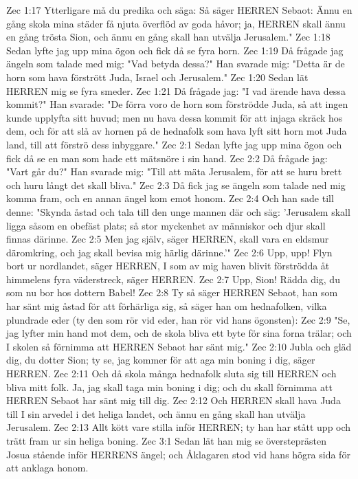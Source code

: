 Zec 1:17  Ytterligare må du predika och säga: Så säger HERREN Sebaot: Ännu en gång skola mina städer få njuta överflöd av goda håvor; ja, HERREN skall ännu en gång trösta Sion, och ännu en gång skall han utvälja Jerusalem."
Zec 1:18  Sedan lyfte jag upp mina ögon och fick då se fyra horn.
Zec 1:19  Då frågade jag ängeln som talade med mig: "Vad betyda dessa?" Han svarade mig: "Detta är de horn som hava förstrött Juda, Israel och Jerusalem."
Zec 1:20  Sedan lät HERREN mig se fyra smeder.
Zec 1:21  Då frågade jag: "I vad ärende hava dessa kommit?" Han svarade: "De förra voro de horn som förströdde Juda, så att ingen kunde upplyfta sitt huvud; men nu hava dessa kommit för att injaga skräck hos dem, och för att slå av hornen på de hednafolk som hava lyft sitt horn mot Juda land, till att förströ dess inbyggare."
Zec 2:1  Sedan lyfte jag upp mina ögon och fick då se en man som hade ett mätsnöre i sin hand.
Zec 2:2  Då frågade jag: "Vart går du?" Han svarade mig: "Till att mäta Jerusalem, för att se huru brett och huru långt det skall bliva."
Zec 2:3  Då fick jag se ängeln som talade ned mig komma fram, och en annan ängel kom emot honom.
Zec 2:4  Och han sade till denne: "Skynda åstad och tala till den unge mannen där och säg: 'Jerusalem skall ligga såsom en obefäst plats; så stor myckenhet av människor och djur skall finnas därinne.
Zec 2:5  Men jag själv, säger HERREN, skall vara en eldsmur däromkring, och jag skall bevisa mig härlig därinne.'"
Zec 2:6  Upp, upp! Flyn bort ur nordlandet, säger HERREN, I som av mig haven blivit förströdda åt himmelens fyra väderstreck, säger HERREN.
Zec 2:7  Upp, Sion! Rädda dig, du som nu bor hos dottern Babel!
Zec 2:8  Ty så säger HERREN Sebaot, han som har sänt mig åstad för att förhärliga sig, så säger han om hednafolken, vilka plundrade eder (ty den som rör vid eder, han rör vid hans ögonsten):
Zec 2:9  "Se, jag lyfter min hand mot dem, och de skola bliva ett byte för sina forna trälar; och I skolen så förnimma att HERREN Sebaot har sänt mig."
Zec 2:10  Jubla och gläd dig, du dotter Sion; ty se, jag kommer för att aga min boning i dig, säger HERREN.
Zec 2:11  Och då skola många hednafolk sluta sig till HERREN och bliva mitt folk. Ja, jag skall taga min boning i dig; och du skall förnimma att HERREN Sebaot har sänt mig till dig.
Zec 2:12  Och HERREN skall hava Juda till I sin arvedel i det heliga landet, och ännu en gång skall han utvälja Jerusalem.
Zec 2:13  Allt kött vare stilla inför HERREN; ty han har stått upp och trätt fram ur sin heliga boning.
Zec 3:1  Sedan lät han mig se översteprästen Josua stående inför HERRENS ängel; och Åklagaren stod vid hans högra sida för att anklaga honom.
